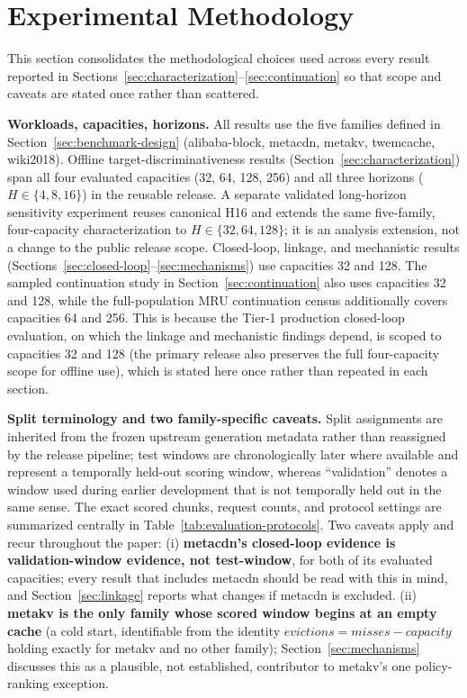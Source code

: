 \section{Experimental Methodology}
\label{sec:experimental-methodology}

This section consolidates the methodological choices used across every
result reported in Sections~\ref{sec:characterization}--\ref{sec:continuation}
so that scope and caveats are stated once rather than scattered.

\textbf{Workloads, capacities, horizons.} All results use the five
families defined in Section~\ref{sec:benchmark-design}
(alibaba-block, metacdn, metakv, twemcache, wiki2018). Offline
target-discriminativeness results (Section~\ref{sec:characterization}) span
all four evaluated capacities (32, 64, 128, 256) and all three horizons
($H\in\{4,8,16\}$) in the reusable release. A separate validated
long-horizon sensitivity experiment reuses canonical H16 and extends the
same five-family, four-capacity characterization to $H\in\{32,64,128\}$;
it is an analysis extension, not a change to the public release scope.
Closed-loop, linkage, and mechanistic results (Sections~\ref{sec:closed-loop}--\ref{sec:mechanisms}) use
capacities 32 and 128. The sampled continuation study in Section~\ref{sec:continuation} also uses
capacities 32 and 128, while the full-population MRU continuation census additionally covers
capacities 64 and 256. This is because the Tier-1 production closed-loop evaluation, on which the linkage
and mechanistic findings depend, is scoped to capacities 32 and 128 (the primary release also preserves the full four-capacity scope for offline use), which is stated here once rather than repeated in each section.

\textbf{Split terminology and two family-specific caveats.} Split assignments
are inherited from the frozen upstream generation metadata rather than reassigned
by the release pipeline; test windows are chronologically later where available and
represent a temporally held-out scoring window, whereas ``validation'' denotes a
window used during earlier development that is not temporally held out in
the same sense. The exact scored chunks, request counts, and protocol settings are
summarized centrally in Table~\ref{tab:evaluation-protocols}. Two caveats
apply and recur throughout the paper: (i)
\textbf{metacdn's closed-loop evidence is validation-window evidence, not
test-window}, for both of its evaluated capacities; every result that
includes metacdn should be read with this in mind, and Section~\ref{sec:linkage}
reports what changes if metacdn is excluded. (ii) \textbf{metakv is the
only family whose scored window begins at an empty cache} (a cold start,
identifiable from the identity $\mathit{evictions} = \mathit{misses} -
\mathit{capacity}$ holding exactly for metakv and no other family);
Section~\ref{sec:mechanisms} discusses this as a plausible, not
established, contributor to metakv's one policy-ranking exception.

